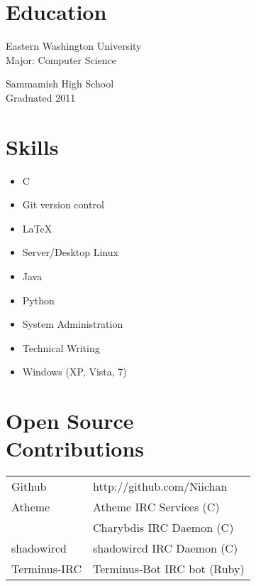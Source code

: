 \documentclass[line, margin]{res}
\begin{document}
\address{12924 SE 26th ST \\ Bellevue WA, 98005 \\ +1 (425) 221-7761}
     
\begin{resume}
\section{Education}
Eastern Washington University \\
Major: Computer Science

Sammamish High School \\
Graduated 2011
     
\section{Skills}
\begin{multicols}{3}
\begin{itemize}
\item C
\item Git version control
\item \LaTeX
\item Server/Desktop Linux
\item Java
\item Python
\item System Administration
\item Technical Writing
\item Windows (XP, Vista, 7)
\end{itemize}
\end{multicols}

\section{Open Source \\ Contributions}
\begin{tabular}{l l}
Github & http://github.com/Niichan \\ [5pt]
Atheme & Atheme IRC Services (C) \\ 
& Charybdis IRC Daemon (C) \\ [5pt]
shadowircd & shadowircd IRC Daemon (C) \\ [5pt]
Terminus-IRC & Terminus-Bot IRC bot (Ruby) \\ [5pt]
\end{tabular}


\end{resume}
\end{document}
